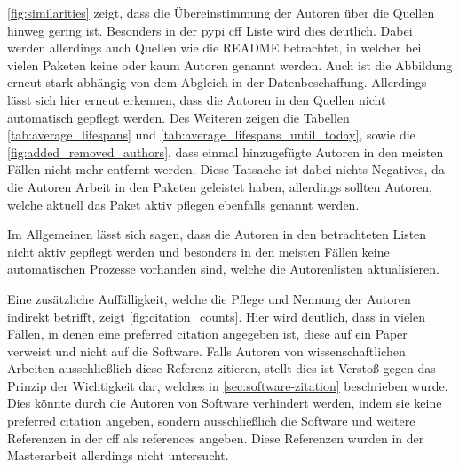\autoref{fig:similarities} zeigt, dass die Übereinstimmung der Autoren über die Quellen hinweg gering ist.
Besonders in der \gls{pypi} \gls{cff} Liste wird dies deutlich.
Dabei werden allerdings auch Quellen wie die README betrachtet, in welcher bei vielen Paketen keine oder kaum Autoren genannt werden.
Auch ist die Abbildung erneut stark abhängig von dem Abgleich in der Datenbeschaffung.
Allerdings lässt sich hier erneut erkennen, dass die Autoren in den Quellen nicht automatisch gepflegt werden.
Des Weiteren zeigen die Tabellen \ref{tab:average_lifespans} und \ref{tab:average_lifespans_until_today}, sowie die \autoref{fig:added_removed_authors}, dass einmal hinzugefügte Autoren in den meisten Fällen nicht mehr entfernt werden.
Diese Tatsache ist dabei nichts Negatives, da die Autoren Arbeit in den Paketen geleistet haben, allerdings sollten Autoren, welche aktuell das Paket aktiv pflegen ebenfalls genannt werden.

Im Allgemeinen lässt sich sagen, dass die Autoren in den betrachteten Listen nicht aktiv gepflegt werden und besonders in den meisten Fällen keine automatischen Prozesse vorhanden sind, welche die Autorenlisten aktualisieren.

Eine zusätzliche Auffälligkeit, welche die Pflege und Nennung der Autoren indirekt betrifft, zeigt \autoref{fig:citation_counts}.
Hier wird deutlich, dass in vielen Fällen, in denen eine \glqq preferred citation\grqq{} angegeben ist, diese auf ein Paper verweist und nicht auf die Software.
Falls Autoren von wissenschaftlichen Arbeiten ausschließlich diese Referenz zitieren, stellt dies ist Verstoß gegen das Prinzip der Wichtigkeit dar, welches in \autoref{sec:software-zitation} beschrieben wurde.
Dies könnte durch die Autoren von Software verhindert werden, indem sie keine \glqq preferred citation\grqq{} angeben, sondern ausschließlich die Software und weitere Referenzen in der \gls{cff} als \glqq references\grqq{} angeben.
Diese Referenzen wurden in der Masterarbeit allerdings nicht untersucht.
